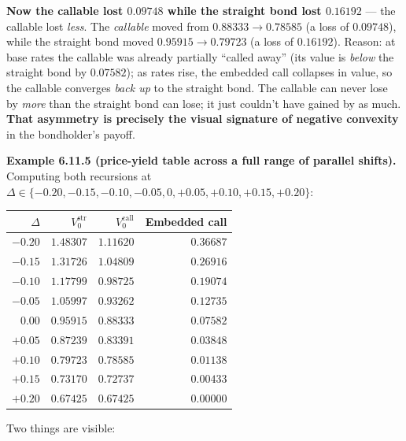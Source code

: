 \documentclass[
  10pt,
  twoside]{book}
\newcounter{none} %
\begin{document}
\textbf{Now the callable lost \(0.09748\) while the straight bond lost
\(0.16192\)} --- the callable lost \emph{less}. The \emph{callable}
moved from \(0.88333 \to 0.78585\) (a loss of \(0.09748\)), while the
straight bond moved \(0.95915 \to 0.79723\) (a loss of \(0.16192\)).
Reason: at base rates the callable was already partially ``called away''
(its value is \emph{below} the straight bond by \(0.07582\)); as rates
rise, the embedded call collapses in value, so the callable converges
\emph{back up} to the straight bond. The callable can never lose by
\emph{more} than the straight bond can lose; it just couldn't have
gained by as much. \textbf{That asymmetry is precisely the visual
signature of negative convexity} in the bondholder's payoff.

\textbf{Example 6.11.5 (price-yield table across a full range of
parallel shifts).} Computing both recursions at
\(\Delta \in \{-0.20, -0.15, -0.10, -0.05, 0, +0.05, +0.10, +0.15, +0.20\}\):

{\def\LTcaptype{none} %
\begin{table}[H]
\centering
\begin{tabular}{|r|r|r|r|}
\toprule
\(\Delta\) & \(V_0^{\text{str}}\) & \(V_0^{\text{call}}\) & Embedded call \\
\midrule



\(-0.20\) & \(1.48307\) & \(1.11620\) & \(0.36687\) \\
\(-0.15\) & \(1.31726\) & \(1.04809\) & \(0.26916\) \\
\(-0.10\) & \(1.17799\) & \(0.98725\) & \(0.19074\) \\
\(-0.05\) & \(1.05997\) & \(0.93262\) & \(0.12735\) \\
\(\mathbf{0.00}\) & \(\mathbf{0.95915}\) & \(\mathbf{0.88333}\) &
\(\mathbf{0.07582}\) \\
\(+0.05\) & \(0.87239\) & \(0.83391\) & \(0.03848\) \\
\(+0.10\) & \(0.79723\) & \(0.78585\) & \(0.01138\) \\
\(+0.15\) & \(0.73170\) & \(0.72737\) & \(0.00433\) \\
\(+0.20\) & \(0.67425\) & \(0.67425\) & \(0.00000\) \\
\bottomrule
\end{tabular}
\end{table}
}

Two things are visible:
\end{document}
